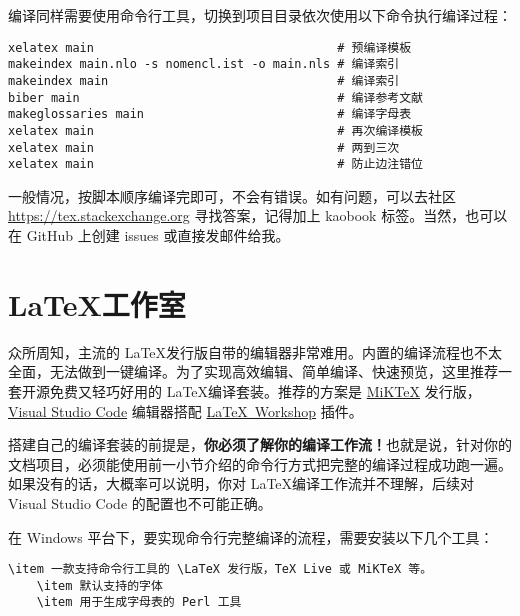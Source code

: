 编译同样需要使用命令行工具，切换到项目目录依次使用以下命令执行编译过程：

\begin{lstlisting}[style=kaolstplain]
xelatex main                                  # 预编译模板
makeindex main.nlo -s nomencl.ist -o main.nls # 编译索引
makeindex main                                # 编译索引
biber main                                    # 编译参考文献
makeglossaries main                           # 编译字母表
xelatex main                                  # 再次编译模板
xelatex main                                  # 两到三次
xelatex main                                  # 防止边注错位
\end{lstlisting}

一般情况，按脚本顺序编译完即可，不会有错误。如有问题，可以去社区 \url{https://tex.stackexchange.org} 寻找答案，记得加上 kaobook 标签。当然，也可以在 GitHub 上创建 issues 或直接发邮件给我。

\section{\LaTeX 工作室}

众所周知，主流的 \LaTeX 发行版自带的编辑器非常难用。内置的编译流程也不太全面，无法做到一键编译。为了实现高效编辑、简单编译、快速预览，这里推荐一套开源免费又轻巧好用的 \LaTeX 编译套装。推荐的方案是 \href{https://miktex.org/}{MiKTeX} 发行版，\href{https://code.visualstudio.com/}{Visual Studio Code} 编辑器搭配 \href{https://marketplace.visualstudio.com/items?itemName=James-Yu.latex-workshop}{\LaTeX\ Workshop} 插件。

搭建自己的编译套装的前提是，\textbf{你必须了解你的编译工作流！}也就是说，针对你的文档项目，必须能使用前一小节介绍的命令行方式把完整的编译过程成功跑一遍。如果没有的话，大概率可以说明，你对 \LaTeX 编译工作流并不理解，后续对 Visual Studio Code 的配置也不可能正确。

在 Windows 平台下，要实现命令行完整编译的流程，需要安装以下几个工具：

\begin{lstlisting}[style=kaolstplain]
	\item 一款支持命令行工具的 \LaTeX 发行版，TeX Live 或 MiKTeX 等。
 	\item 默认支持的字体
 	\item 用于生成字母表的 Perl 工具
\end{lstlisting}

